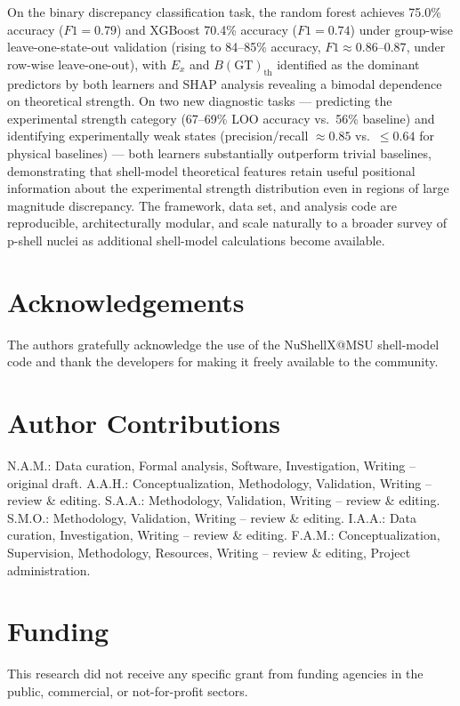 \documentclass[10pt,twocolumn]{article}
\begin{document}
On the binary discrepancy classification task, the random forest achieves 75.0\% accuracy ($F1=0.79$) and XGBoost 70.4\% accuracy ($F1=0.74$) under group-wise leave-one-state-out validation (rising to 84--85\% accuracy, $F1\approx0.86$--$0.87$, under row-wise leave-one-out), with $E_x$ and $B(\mathrm{GT})_{\mathrm{th}}$ identified as the dominant predictors by both learners and SHAP analysis revealing a bimodal dependence on theoretical strength. On two new diagnostic tasks --- predicting the experimental strength category (67--69\% LOO accuracy vs.\ 56\% baseline) and identifying experimentally weak states (precision/recall $\approx0.85$ vs.\ $\le0.64$ for physical baselines) --- both learners substantially outperform trivial baselines, demonstrating that shell-model theoretical features retain useful positional information about the experimental strength distribution even in regions of large magnitude discrepancy. The framework, data set, and analysis code are reproducible, architecturally modular, and scale naturally to a broader survey of p-shell nuclei as additional shell-model calculations become available.

\section*{Acknowledgements}
The authors gratefully acknowledge the use of the NuShellX@MSU shell-model code and thank the developers for making it freely available to the community.

\section*{Author Contributions}
N.A.M.: Data curation, Formal analysis, Software, Investigation, Writing -- original draft. A.A.H.: Conceptualization, Methodology, Validation, Writing -- review \& editing. S.A.A.: Methodology, Validation, Writing -- review \& editing. S.M.O.: Methodology, Validation, Writing -- review \& editing. I.A.A.: Data curation, Investigation, Writing -- review \& editing. F.A.M.: Conceptualization, Supervision, Methodology, Resources, Writing -- review \& editing, Project administration.

\section*{Funding}
This research did not receive any specific grant from funding agencies in the public, commercial, or not-for-profit sectors.
\end{document}
